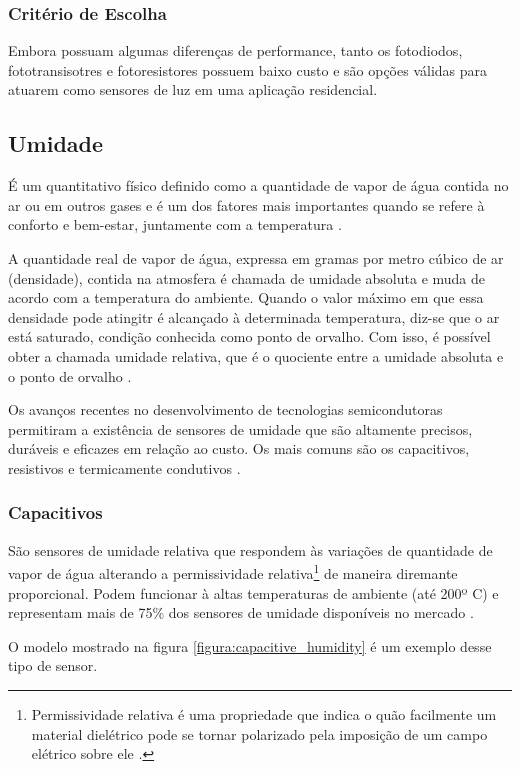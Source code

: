 \subsubsection{Critério de Escolha}
Embora possuam algumas diferenças de performance, tanto os fotodiodos, fototransisotres e fotoresistores
possuem baixo custo e são opções válidas para atuarem como sensores de luz em uma aplicação residencial.

\subsection{Umidade}
É um quantitativo físico definido como a quantidade de vapor de água contida no ar ou em outros gases e é um
dos fatores mais importantes quando se refere à conforto e bem-estar, juntamente com a temperatura
\cite{fontesII2005,fraden2010}.

A quantidade real de vapor de água, expressa em gramas por metro cúbico de ar (densidade), contida na
atmosfera é chamada de umidade absoluta e muda de acordo com a temperatura do ambiente. Quando o valor máximo
em que essa densidade pode atingitr é alcançado à determinada temperatura, diz-se que o ar está saturado,
condição conhecida como ponto de orvalho. Com isso, é possível obter a chamada umidade relativa, que é o
quociente entre a umidade absoluta e o ponto de orvalho \cite{fraden2010,thomazini_albuquerque2005}.

Os avanços recentes no desenvolvimento de tecnologias semicondutoras permitiram a existência de sensores de
umidade que são altamente precisos, duráveis e eficazes em relação ao custo. Os mais comuns são os
capacitivos, resistivos e termicamente condutivos \cite{fontesII2005}.

\subsubsection{Capacitivos}
São sensores de umidade relativa que respondem às variações de quantidade de vapor de água alterando a
permissividade relativa\footnote{Permissividade relativa é uma propriedade que indica o quão facilmente um
material dielétrico pode se tornar polarizado pela imposição de um campo elétrico sobre ele
\cite{engineeringtoolbox}.} de maneira diremante proporcional. Podem funcionar à altas temperaturas de ambiente
(até 200º C) e representam mais de 75\% dos sensores de umidade disponíveis no mercado
\cite{farahani_wagiran_hamidon2014}.

O modelo mostrado na figura \ref{figura:capacitive_humidity} é um exemplo desse tipo de sensor.


